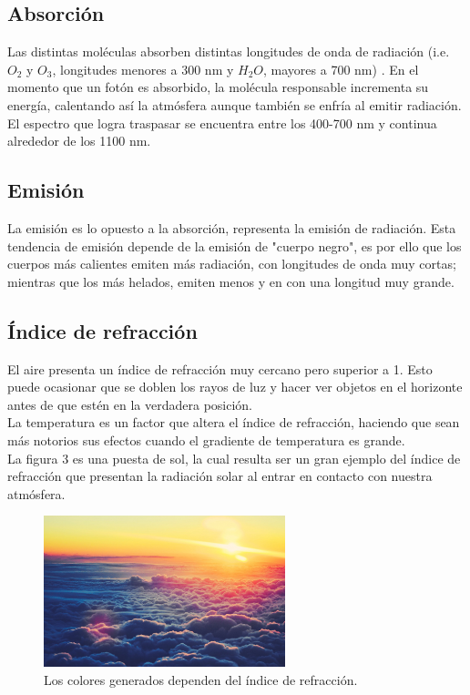 \subsection{Absorción}
Las distintas moléculas absorben distintas longitudes de onda
de radiación (i.e. $O_2$ y $O_3$, longitudes menores a 300 nm
y $H_2 O$, mayores a 700 nm) . En el momento que un fotón es
absorbido, la molécula responsable incrementa su energía,
calentando así la atmósfera aunque también se enfría al emitir
radiación.
\\[3mm] El espectro que logra traspasar se encuentra entre los
400-700 nm y continua alrededor de los 1100 nm.

\subsection{Emisión}
La emisión es lo opuesto a la absorción, representa la emisión
de radiación. Esta tendencia de emisión depende de la emisión
de "cuerpo negro", es por ello que los cuerpos más calientes
emiten más radiación, con longitudes de onda muy cortas; mientras
que los más helados, emiten menos y en con una longitud muy grande.

\subsection{Índice de refracción}
El aire presenta un índice de refracción muy cercano pero superior
a 1. Esto puede ocasionar que se doblen los rayos de luz y hacer
ver objetos en el horizonte antes de que estén en la verdadera
posición.
\\ La temperatura es un factor que altera el índice de refracción,
haciendo que sean más notorios sus efectos cuando el gradiente de
temperatura es grande.
\\[3mm] La figura 3 es una puesta de sol, la cual resulta ser un gran
ejemplo del índice de refracción que presentan la radiación solar al
entrar en contacto con nuestra atmósfera.

\begin{figure}
\centering
\includegraphics[width=7cm]{puesta}
\caption{\label{puesta}Los colores generados dependen del índice de refracción.}
\end{figure}

